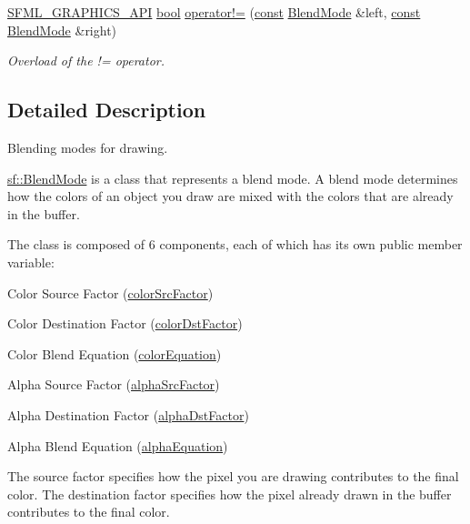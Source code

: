 \begin{DoxyCompactItemize}
\hyperlink{sfml_2dep_2_s_f_m_l-2_84_82_2include_2_s_f_m_l_2_graphics_2_export_8hpp_ab84c9f1035e146917de3bc0f98d72b35}{S\-F\-M\-L\-\_\-\-G\-R\-A\-P\-H\-I\-C\-S\-\_\-\-A\-P\-I} \hyperlink{term__entry_8h_a002004ba5d663f149f6c38064926abac}{bool} \hyperlink{structsf_1_1_blend_mode_a0c08bfcb9b6911104dcc0c0cddde522a}{operator!=} (\hyperlink{term__entry_8h_a57bd63ce7f9a353488880e3de6692d5a}{const} \hyperlink{structsf_1_1_blend_mode}{Blend\-Mode} \&left, \hyperlink{term__entry_8h_a57bd63ce7f9a353488880e3de6692d5a}{const} \hyperlink{structsf_1_1_blend_mode}{Blend\-Mode} \&right)
\begin{DoxyCompactList}\small\item\em Overload of the != operator. \end{DoxyCompactList}\end{DoxyCompactItemize}


\subsection{Detailed Description}
Blending modes for drawing. 

\hyperlink{structsf_1_1_blend_mode}{sf\-::\-Blend\-Mode} is a class that represents a blend mode. A blend mode determines how the colors of an object you draw are mixed with the colors that are already in the buffer.

The class is composed of 6 components, each of which has its own public member variable\-: \begin{DoxyItemize}
\item Color Source Factor (\hyperlink{structsf_1_1_blend_mode_a32d1a55dbfada86a06d9b881dc8ccf7b}{color\-Src\-Factor}) \item Color Destination Factor (\hyperlink{structsf_1_1_blend_mode_adee68ee59e7f1bf71d12db03d251104d}{color\-Dst\-Factor}) \item Color Blend Equation (\hyperlink{structsf_1_1_blend_mode_aed12f06eb7f50a1b95b892b0964857b1}{color\-Equation}) \item Alpha Source Factor (\hyperlink{structsf_1_1_blend_mode_aa94e44f8e1042a7357e8eff78c61a1be}{alpha\-Src\-Factor}) \item Alpha Destination Factor (\hyperlink{structsf_1_1_blend_mode_aaf85b6b7943181cc81745569c4851e4e}{alpha\-Dst\-Factor}) \item Alpha Blend Equation (\hyperlink{structsf_1_1_blend_mode_a68f5a305e0912946f39ba6c9265710c4}{alpha\-Equation})\end{DoxyItemize}
The source factor specifies how the pixel you are drawing contributes to the final color. The destination factor specifies how the pixel already drawn in the buffer contributes to the final color.

